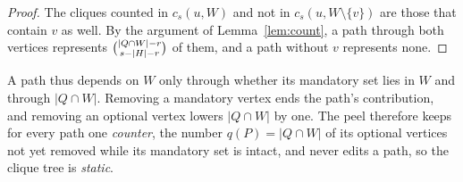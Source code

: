 \begin{proof}
The cliques counted in $c_s(u,W)$ and not in $c_s(u,W\setminus\{v\})$ are those that contain $v$ as well.
%
By the argument of Lemma~\ref{lem:count}, a path through both vertices represents $\binom{|Q\cap W|-r}{s-|H|-r}$ of them, and a path without $v$ represents none.
\end{proof}
A path thus depends on $W$ only through whether its mandatory set lies in $W$ and through $|Q\cap W|$.
%
Removing a mandatory vertex ends the path's contribution, and removing an optional vertex lowers $|Q\cap W|$ by one.
%
The peel therefore keeps for every path one \textit{counter}, the number $q(P)=|Q\cap W|$ of its optional vertices not yet removed while its mandatory set is intact, and never edits a path, so the clique tree is \textit{static}.

